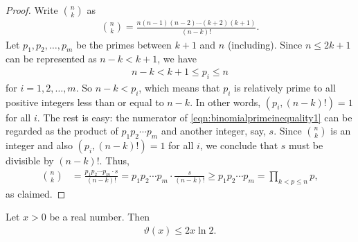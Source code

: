 	\begin{proof}
		Write $\binom{n}{k}$ as
			\begin{align}
				\label{eqn:binomialprimeinequality1}
				\binom{n}{k} = \frac{n(n-1)(n-2) \cdots (k+2)(k+1)}{(n-k)!}.
			\end{align}
		Let $p_1, p_2, \ldots, p_m$ be the primes between $k+1$ and $n$ (including). Since $n \leq 2k+1$ can be represented as $n-k < k+1$, we have
			\begin{align*}
				n-k < k+1 \leq p_i \leq n
			\end{align*}
		for $i=1,2,\ldots,m$. So $n-k < p_i$, which means that $p_i$ is relatively prime to all positive integers less than or equal to $n-k$. In other words, $(p_i, (n-k)!)=1$ for all $i$. The rest is easy: the numerator of \eqref{eqn:binomialprimeinequality1} can be regarded as the product of $p_1p_2\cdots p_m$ and another integer, say, $s$. Since $\binom{n}{k}$ is an integer and also $(p_i, (n-k)!)=1$ for all $i$, we conclude that $s$ must be divisible by $(n-k)!$. Thus,
			\begin{align*}
			\binom{n}{k} & = \frac{p_1p_2\cdots p_m \cdot s}{(n-k)!}= p_1p_2\cdots p_m \cdot \frac{s}{(n-k)!}  \geq p_1p_2\cdots p_m  = \prod_{k < p \leq n} p,
			\end{align*}
		as claimed.
	\end{proof}
	
	\begin{proposition}
		\label{prop:chebyshevthetainequality}
		Let $x >0$ be a real number. Then
			\begin{align}
			\label{eqn:chebyshevthetainequality1}
				\vartheta(x) \leq 2x \ln 2.
			\end{align}
	\end{proposition}
	
